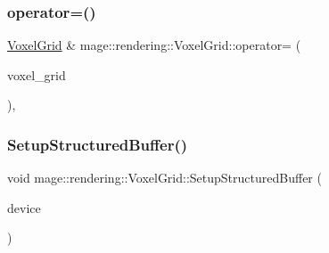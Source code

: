 \hypertarget{classmage_1_1rendering_1_1_voxel_grid_a9e0ae3de8c583879a3db8b6d787138ac}{}\label{classmage_1_1rendering_1_1_voxel_grid_a9e0ae3de8c583879a3db8b6d787138ac} 
\subsubsection{\texorpdfstring{operator=()}{operator=()}\hspace{0.1cm}{\footnotesize\ttfamily [2/2]}}
{\footnotesize\ttfamily \hyperlink{classmage_1_1rendering_1_1_voxel_grid}{Voxel\+Grid} \& mage\+::rendering\+::\+Voxel\+Grid\+::operator= (\begin{DoxyParamCaption}\item[{\hyperlink{classmage_1_1rendering_1_1_voxel_grid}{Voxel\+Grid} \&\&}]{voxel\+\_\+grid }\end{DoxyParamCaption})\hspace{0.3cm}{\ttfamily [default]}, {\ttfamily [noexcept]}}

\hypertarget{classmage_1_1rendering_1_1_voxel_grid_a8f24eca860d059316a1aa40f2e878ecc}{}\label{classmage_1_1rendering_1_1_voxel_grid_a8f24eca860d059316a1aa40f2e878ecc} 
\subsubsection{\texorpdfstring{Setup\+Structured\+Buffer()}{SetupStructuredBuffer()}}
{\footnotesize\ttfamily void mage\+::rendering\+::\+Voxel\+Grid\+::\+Setup\+Structured\+Buffer (\begin{DoxyParamCaption}\item[{I\+D3\+D11\+Device \&}]{device }\end{DoxyParamCaption})\hspace{0.3cm}{\ttfamily [private]}}

\hypertarget{classmage_1_1rendering_1_1_voxel_grid_aa9b3ab18a4741ab9aa007965a43224eb}{}\label{classmage_1_1rendering_1_1_voxel_grid_aa9b3ab18a4741ab9aa007965a43224eb} 
